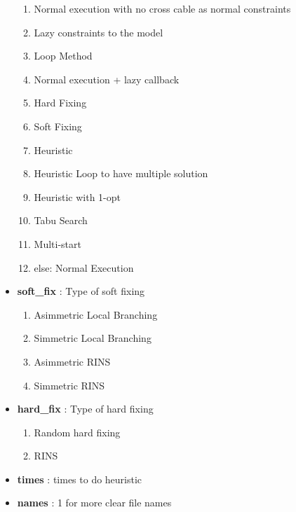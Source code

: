 \begin{appendices}
\begin{itemize}
\begin{enumerate}
\setlength{\itemsep}{0pt plus 1pt}
	\item Normal execution with no cross cable as normal constraints
	\item Lazy constraints to the model
	\item Loop Method
	\item Normal execution + lazy callback
	\item Hard Fixing
	\item Soft Fixing
	\item Heuristic
	\item Heuristic Loop to have multiple solution
	\item Heuristic with 1-opt
	\item Tabu Search
	\item Multi-start
	\item[] else: Normal Execution
\end{enumerate}
\item \textbf{soft\_fix} : Type of soft fixing
\begin{enumerate}\setcounter{enumi}{0}
\setlength{\parskip}{0pt}
\setlength{\itemsep}{0pt plus 1pt}
	\item Asimmetric Local Branching
	\item Simmetric Local Branching
	\item Asimmetric RINS
	\item Simmetric RINS
\end{enumerate}
\item \textbf{hard\_fix} : Type of hard fixing
\begin{enumerate}\setcounter{enumi}{0}
\setlength{\parskip}{0pt}
\setlength{\itemsep}{0pt plus 1pt}
	\item Random hard fixing
	\item RINS
\end{enumerate}
\item \textbf{times} : times to do heuristic
\item \textbf{names} : 1 for more clear file names
\end{itemize}


\end{appendices}
